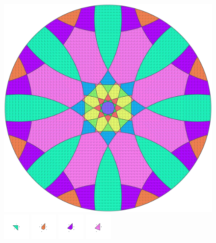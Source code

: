 \documentclass[text.tex]{subfiles}
\begin{document}
\clearpage
\pagestyle{fancy}
\fancyhf{}
\begin{figure}[h!]
\centering
\includegraphics[width=1\textwidth]{img/results/circle8/circle8_196933_(1366_-565alpha_1).pdf}
\includegraphics[width=0.12\textwidth]{img/results/circle8/circle8_196933_(1366_-565alpha_1)_001.pdf}
\includegraphics[width=0.12\textwidth]{img/results/circle8/circle8_196933_(1366_-565alpha_1)_002.pdf}
\includegraphics[width=0.12\textwidth]{img/results/circle8/circle8_196933_(1366_-565alpha_1)_003.pdf}
\includegraphics[width=0.12\textwidth]{img/results/circle8/circle8_196933_(1366_-565alpha_1)_004.pdf}

\end{figure}
\end{document}
